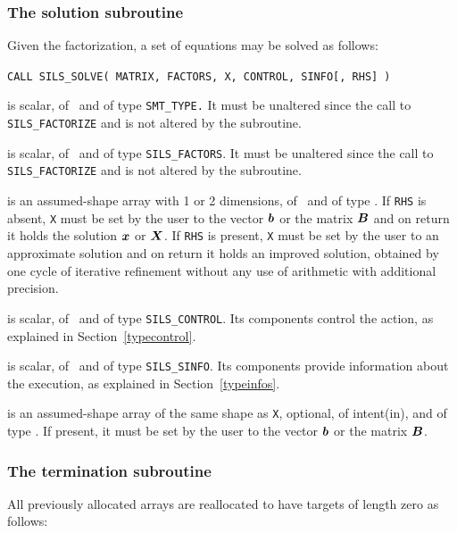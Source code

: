 \documentclass{galahad}
\newcommand{\packagename}{SILS}
\begin{document}

\subsubsection{The solution subroutine}
Given the factorization, a set of equations may be solved as follows:

\hskip0.5in 
{\tt CALL \packagename\_SOLVE( MATRIX, FACTORS, X, CONTROL, SINFO[, RHS] )}

\begin{description}

 is scalar, of \intentin\ and of type {\tt SMT\_TYPE.}  It 
must be unaltered since the call to {\tt \packagename\_FACTORIZE} and is  
not altered by the subroutine. 
 
 is scalar, of \intentin\ and of type {\tt \packagename\_FACTORS}.
It must be unaltered since the call to {\tt \packagename\_FACTORIZE} and is  
not altered by the subroutine. 
 
 is an assumed-shape array with 1 or 2 dimensions, of 
\intentinout\, and of type \realdp.  If {\tt RHS} is absent, {\tt X} must 
be set 
by the user to the vector ${\bm{b}}$ or the matrix ${\bm{B}}$ and on return it holds 
the solution ${\bm{x}}$ or ${\bm{X}}$. 
If {\tt RHS} is present, {\tt X} must be set by the user 
to an approximate solution and on return it holds an improved solution, 
obtained by one cycle of iterative refinement without any use of 
arithmetic with additional precision. 
 
 is scalar, of \intentin\ and of type {\tt \packagename\_CONTROL}.
Its components control the action, as explained in Section~\ref{typecontrol}. 
 
 is scalar, of \intentout\, and of type {\tt \packagename\_SINFO}.  
Its components provide information about the execution, as explained in 
Section~\ref{typeinfos}.
 
 is an assumed-shape array of the same shape as {\tt X}, optional, of 
intent(in), and of type \realdp. If present, it must be set by the user 
to the vector ${\bm{b}}$ or the matrix ${\bm{B}}$. 

\end{description}


\subsubsection{The termination subroutine}
All previously allocated arrays are reallocated to have targets of length zero
as follows:
\end{document}
